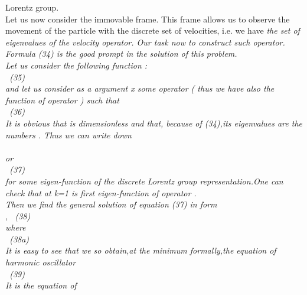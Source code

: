 \documentclass[a4paper,12pt] {article}
\begin{document}
{ Lorentz group.
\\ Let us now consider the immovable frame. This frame allows us to observe the movement of  the
 particle with the discrete
set of velocities, i.e. we have \it the set of  eigenvalues  of the velocity operator. \rm Our task now to
construct such operator. Formula (34) \it is the good prompt  in the solution of this problem. \\  \rm Let
us consider  the following function : \\\coordHE{}  \ (35)\\ and let us  consider
 as a argument x  \it  some operator  \coordHE{} \rm ( thus we have also \it the function of operator
\coordHE{}) \rm  such that \\\coordHE{} \ (36)\\ It is obvious that
 \coordHE{} is dimensionless and that, because of (34),its  eigenvalues  are the numbers \coordHE{}.
Thus we can write down \\\coordHE{}
\\or\\\coordHE{}  \ (37)
\\for some  eigen-function  \myHighlight{$  \tilde \Psi $}\coordHE{} of the discrete Lorentz group representation.One can check
that at k=1 \coordHE{} is \it first  eigen-function of operator \coordHE{}.
\\ \rm  Then we find the general solution of equation (37) in form \\\coordHE{} , \ (38) \\where\\ \coordHE{} \ (38a) \\ It is easy to see that we so obtain,at the
 minimum formally,\it the equation of  harmonic oscillator
 \\\coordHE{}  \rm \ (39) \\ It is the equation of
}
\end{document}
